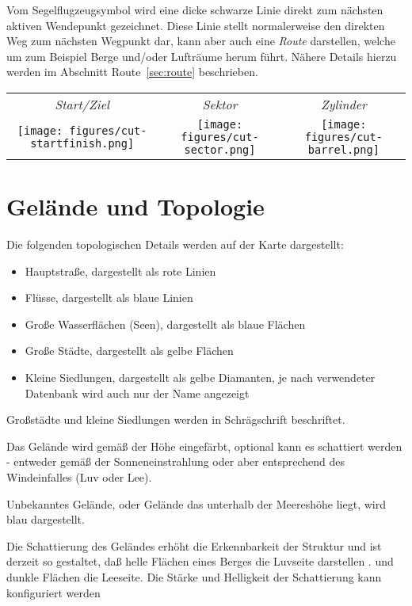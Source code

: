 Vom Segelflugzeugsymbol wird eine dicke schwarze Linie direkt zum nächsten aktiven Wendepunkt gezeichnet. Diese Linie stellt normalerweise den direkten Weg zum nächsten Wegpunkt dar, kann aber auch eine {\em Route} darstellen, welche um zum Beispiel Berge und/oder Lufträume herum führt. Nähere Details hierzu werden im Abschnitt Route~\ref{sec:route}  beschrieben.
\begin{center}
\begin{tabular}{c c c}
{\it Start/Ziel} & {\it Sektor} & {\it Zylinder} \\
\texttt{[image: figures/cut-startfinish.png]} &
\texttt{[image: figures/cut-sector.png]} &
\texttt{[image: figures/cut-barrel.png]} \\
\end{tabular}
\end{center}
\section{Gelände und Topologie}

Die folgenden topologischen Details werden auf der Karte dargestellt:
\begin{itemize}
\item Hauptstraße, dargestellt als rote Linien
\item Flüsse, dargestellt als blaue Linien
\item Große Wasserflächen (Seen), dargestellt als blaue Flächen
\item Große Städte, dargestellt als gelbe Flächen
\item Kleine Siedlungen, dargestellt als gelbe Diamanten, je nach verwendeter Datenbank wird auch nur der Name angezeigt 
\end{itemize}
Großstädte und kleine Siedlungen werden in Schrägschrift beschriftet.

Das Gelände wird gemäß der Höhe eingefärbt, optional kann es schattiert werden -  entweder gemäß der Sonneneinstrahlung oder aber entsprechend des Windeinfalles (Luv oder Lee).

Unbekanntes Gelände, oder Gelände das unterhalb der Meereshöhe liegt, wird blau dargestellt.

Die Schattierung des Geländes erhöht die Erkennbarkeit der Struktur und ist derzeit so gestaltet, daß helle Flächen eines Berges die Luvseite darstellen . und dunkle Flächen die Leeseite.
Die Stärke und Helligkeit der Schattierung kann konfiguriert werden 

